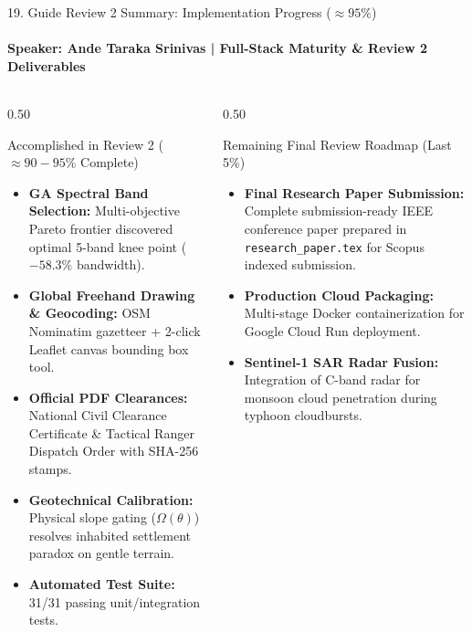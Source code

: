 \documentclass[aspectratio=169, 11pt]{beamer}
\begin{document}
\begin{frame}{19. Guide Review 2 Summary: Implementation Progress ($\approx 95\%$)}
    \framesubtitle{\textbf{\textcolor{amritaGold}{Speaker: Ande Taraka Srinivas}} \quad | \quad Full-Stack Maturity \& Review 2 Deliverables}
    \begin{columns}[t]
        \begin{column}{0.50\textwidth}
            \begin{block}{Accomplished in Review 2 ($\approx 90-95\%$ Complete)}
                \footnotesize
                \begin{itemize}
                    \setlength{\itemsep}{2pt}
                    \item[$\checkmark$] \textbf{GA Spectral Band Selection:} Multi-objective Pareto frontier discovered optimal 5-band knee point ($-58.3\%$ bandwidth).
                    \item[$\checkmark$] \textbf{Global Freehand Drawing \& Geocoding:} OSM Nominatim gazetteer + 2-click Leaflet canvas bounding box tool.
                    \item[$\checkmark$] \textbf{Official PDF Clearances:} National Civil Clearance Certificate \& Tactical Ranger Dispatch Order with SHA-256 stamps.
                    \item[$\checkmark$] \textbf{Geotechnical Calibration:} Physical slope gating ($\Omega(\theta)$) resolves inhabited settlement paradox on gentle terrain.
                    \item[$\checkmark$] \textbf{Automated Test Suite:} 31/31 passing unit/integration tests.
                \end{itemize}
            \end{block}
        \end{column}
        \begin{column}{0.50\textwidth}
            \begin{exampleblock}{Remaining Final Review Roadmap (Last 5\%)}
                \footnotesize
                \begin{itemize}
                    \setlength{\itemsep}{2.5pt}
                    \item \textbf{Final Research Paper Submission:} Complete submission-ready IEEE conference paper prepared in \texttt{research\_paper.tex} for Scopus indexed submission.
                    \item \textbf{Production Cloud Packaging:} Multi-stage Docker containerization for Google Cloud Run deployment.
                    \item \textbf{Sentinel-1 SAR Radar Fusion:} Integration of C-band radar for monsoon cloud penetration during typhoon cloudbursts.
                \end{itemize}
            \end{exampleblock}
        \end{column}
    \end{columns}
\end{frame}
\end{document}
